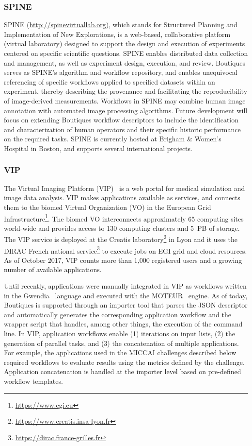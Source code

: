 \documentclass[a4paper,num-refs]{oup-contemporary}
\begin{document}
\subsubsection{SPINE}
SPINE (\url{http://spinevirtuallab.org}), which stands for Structured
Planning and Implementation of New Explorations, is a web-based,
collaborative platform (virtual laboratory) designed to support the
design and execution of experiments centered on specific scientific
questions.  SPINE enables distributed data collection and management,
as well as experiment design, execution, and review. Boutiques serves
as SPINE's algorithm and workflow repository, and enables unequivocal
referencing of specific workflows applied to specified datasets within
an experiment, thereby describing the provenance and facilitating the
reproducibility of image-derived measurements. Workflows in SPINE may
combine human image annotation with automated image processing
algorithms. Future development will focus on extending Boutiques
workflow descriptors to include the identification and
characterization of human operators and their specific historic
performance on the required tasks. SPINE is currently hosted at
Brigham \& Women's Hospital in Boston, and supports several
international projects.

\subsubsection{VIP}

The Virtual Imaging Platform (VIP)~\cite{GLAT-13} is a web portal for
medical simulation and image data analysis. VIP makes applications
available as services, and connects them to the biomed Virtual
Organization (VO) in the European Grid
Infrastructure\footnote{\url{https://www.egi.eu}}. The biomed VO
interconnects approximately 65 computing sites world-wide and provides
access to 130 computing clusters and 5~PB of storage.  The VIP service
is deployed at the Creatis
laboratory\footnote{\url{https://www.creatis.insa-lyon.fr}} in Lyon
and it uses the DIRAC French national
service\footnote{\url{https://dirac.france-grilles.fr}} to execute
jobs on EGI grid and cloud resources.  As of October 2017, VIP counts
more than 1,000 registered users and a growing number of available
applications.

Until recently, applications were manually integrated in VIP as
workflows written in the Gwendia~\cite{MONT-09} language and executed
with the MOTEUR~\cite{GLAT-08} engine.  As of today, Boutiques is
supported through an importer tool that parses the JSON descriptor and
automatically generates the corresponding application workflow and the
wrapper script that handles, among other things, the execution of the
command line.  In VIP, application workflows enable (1) iterations on
input lists, (2) the generation of parallel tasks, and (3) the
concatenation of multiple applications. For example, the applications
used in the MICCAI challenges described below required workflows to
evaluate results using the metrics defined by the
challenge. Application concatenation is handled at the importer level
based on pre-defined workflow templates.
\end{document}
